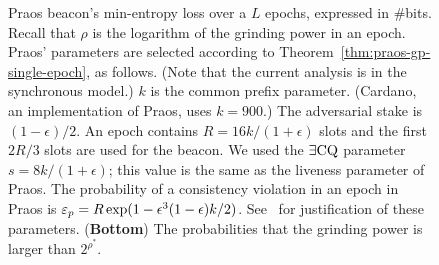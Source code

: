 \begin{figure}[!htb]
{        Praos beacon's min-entropy loss over a $L$ epochs, 
        expressed in \#bits.  
        Recall that $\rho$ is the logarithm of the grinding power in an epoch.     
        Praos' parameters are selected according to Theorem~\ref{thm:praos-gp-single-epoch}, 
        as follows.
        (Note that the current analysis is in the synchronous model.)
        $k$ is the common prefix parameter. 
        (Cardano, an implementation of Praos, uses $k = 900$.) 
        The adversarial stake is $(1-\epsilon)/2$.
        An epoch contains $R = 16 k/(1+\epsilon)$ slots and the first $2R/3$ slots are used for the beacon. 
        We used the $\exists\mathrm{CQ}$ parameter $s = 8 k/(1+\epsilon)$; 
        this value is the same as the liveness parameter of Praos. 
        The probability of a consistency violation in an epoch in Praos is 
        $\mathsf{\varepsilon}_p = R \exp(1-\epsilon^3 (1-\epsilon)k/2) $. 
        See~\citet[Theorem 9]{Praos} for justification of these parameters. 
        (\textbf{Bottom}) The probabilities that the grinding power is larger than $2^{\rho^*}$.
    }
    \label{fig:praos-beacon-multi-epoch}
\end{figure}
